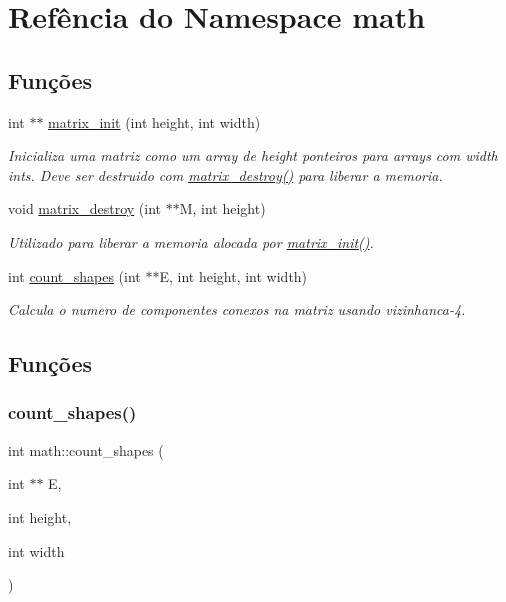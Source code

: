 \hypertarget{namespacemath}{}\section{Refência do Namespace math}
\label{namespacemath}
\subsection*{Funções}
\begin{DoxyCompactItemize}
\item 
int $\ast$$\ast$ \mbox{\hyperlink{namespacemath_ac47b11361b7d12063c2c2d3c3f030e6d}{matrix\+\_\+init}} (int height, int width)
\begin{DoxyCompactList}\small\item\em Inicializa uma matriz como um array de height ponteiros para arrays com width ints. Deve ser destruido com \mbox{\hyperlink{namespacemath_ab71def2c0ba5a16ca9b8b0ad9ed7034f}{matrix\+\_\+destroy()}} para liberar a memoria. \end{DoxyCompactList}\item 
void \mbox{\hyperlink{namespacemath_ab71def2c0ba5a16ca9b8b0ad9ed7034f}{matrix\+\_\+destroy}} (int $\ast$$\ast$M, int height)
\begin{DoxyCompactList}\small\item\em Utilizado para liberar a memoria alocada por \mbox{\hyperlink{namespacemath_ac47b11361b7d12063c2c2d3c3f030e6d}{matrix\+\_\+init()}}. \end{DoxyCompactList}\item 
int \mbox{\hyperlink{namespacemath_aacf8a030574da06fa612813bf3ffa705}{count\+\_\+shapes}} (int $\ast$$\ast$E, int height, int width)
\begin{DoxyCompactList}\small\item\em Calcula o numero de componentes conexos na matriz usando vizinhanca-\/4. \end{DoxyCompactList}\end{DoxyCompactItemize}


\subsection{Funções}
\mbox{\label{namespacemath_aacf8a030574da06fa612813bf3ffa705}} 
\subsubsection{\texorpdfstring{count\_shapes()}{count\_shapes()}}
{\footnotesize\ttfamily int math\+::count\+\_\+shapes (\begin{DoxyParamCaption}\item[{int $\ast$$\ast$}]{E,  }\item[{int}]{height,  }\item[{int}]{width }\end{DoxyParamCaption})}



